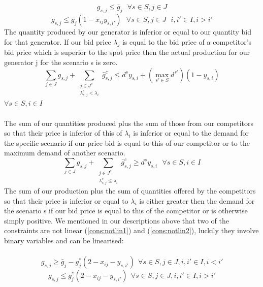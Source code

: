 \documentclass[letterpaper]{article}
\begin{document}
\begin{equation}
g_{s,j} \le \bar{g}_j \ \ \  \forall s \in S, j \in J
\end{equation}
\begin{equation}
g_{s,j} \le \bar{g}_j \left( 1 - x_{ij} y_{s,i'} \right) \ \ \  \forall s \in S, j \in J \ \ \  i, i' \in I, i > i' \label{cons:notlin2}
\end{equation}
The quantity produced by our generator is inferior or equal to our quantity bid for that generator. If our bid price $\lambda_j$ is equal to the bid price of a competitor's bid price which is superior to the spot price then the actual production for our generator j for the scenario s is zero.\\
\begin{equation}
\sum_{j \in J} g_{s,j} + \sum_{\substack{j \in J^c \\ \lambda^c_{s,j} < \lambda_i}} \bar{g}^c_{s,j} \le d^s y_{s,i} + \left(\max_{s' \in S} d^{s'} \right) (1 - y_{s,i})
\end{equation}
$\forall s \in S, i \in I$\\ \\
The sum of our quantities produced plus the sum of those from our competitors so that their price is inferior of this of $\lambda_i$ is inferior or equal to the demand for the specific scenario if our price bid is equal to this of our competitor or to the maximum demand of another scenario.
\begin{equation}
\sum_{j \in J} g_{s,j} + \sum_{\substack{j \in J^c \\ \lambda^c_{s,j} \le \lambda_i}} \bar{g}^c_{s,j} \ge d^s y_{s,i}\ \ \  \forall s \in S, i \in I
\end{equation}
The sum of our production plus the sum of quantities offered by the competitors so that their price is inferior or equal to $\lambda_i$ is either greater then the demand for the scenario s if our bid price is equal to this of the competitor or is otherwise simply positive.
We mentioned in our descriptions above that two of the constraints are not linear (\ref{cons:notlin1}) and (\ref{cons:notlin2}), luckily they involve binary variables and can be linearised:\\ \\
\begin{equation}
g_{s,j} \ge \bar{g}_j - g^*_j (2 - x_{ij} - y_{s,i'}) \ \  \forall s \in S, j \in J, i, i' \in I, i < i'\label{cons:lin1}
\end{equation}
\begin{equation}
g_{s,j} \le g^*_j (2 - x_{ij} - y_{s,i'}) \ \  \forall s \in S, j \in J, i, i' \in I, i > i'\label{cons:lin2}
\end{equation}\\\\
\end{document}
